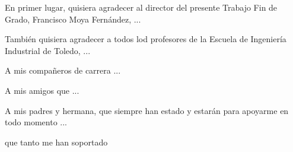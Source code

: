 \begin{agradecimientos}

En primer lugar, quisiera agradecer al director del presente Trabajo Fin de Grado, Francisco Moya Fernández, ...

También quisiera agradecer a todos lod profesores de la Escuela de Ingeniería Industrial de Toledo, ...

A mis compañeros de carrera ...

A mis amigos que ...

A mis padres y hermana, que siempre han estado y estarán para apoyarme en todo momento ...

que tanto me han soportado 

\end{agradecimientos}